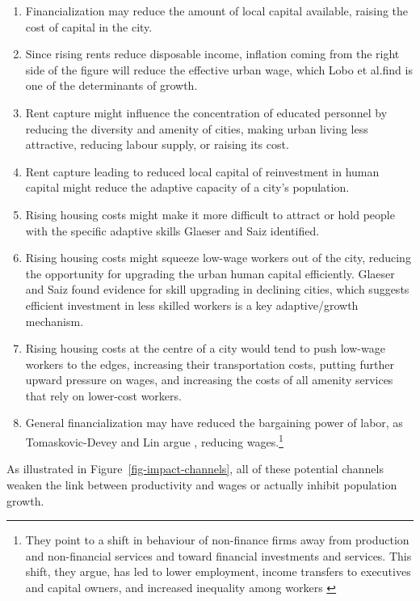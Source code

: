 \begin{enumerate}
\item Financialization may reduce the amount of local capital available, raising the cost of capital in the city. 
    
\item Since rising rents reduce disposable income, inflation coming from the right side of the figure will reduce the effective urban wage, which Lobo et al.find is one of the determinants of growth.

\item Rent capture might influence the concentration of educated personnel by reducing the diversity and amenity of cities, making urban living less attractive, reducing labour supply, or raising its cost.

\item Rent capture leading to reduced local capital of reinvestment in human capital might reduce the adaptive capacity of a city's population.

\item Rising housing costs might make it more difficult to attract or hold people with the specific adaptive skills Glaeser and Saiz identified.

\item  Rising housing costs might squeeze low-wage workers out of the city, reducing the opportunity for upgrading the urban human capital efficiently. Glaeser and Saiz found evidence for skill upgrading in declining cities, which suggests efficient investment in less skilled workers is a key adaptive/growth mechanism. 

\item Rising housing costs at the centre of a city would tend to push low-wage workers to the edges, increasing their transportation costs, putting further upward pressure on wages, and increasing the costs of all amenity services that rely on lower-cost workers.

\item General financialization may have reduced the bargaining power of labor, as Tomaskovic-Devey and Lin argue \cite{tomaskovic-deveyFinancializationCausesInequality2013}, reducing wages.\footnote{They point to a shift in behaviour of non-finance firms away from production and non-financial services and toward financial investments and services. This shift, they argue,  has led to lower employment, income transfers to executives and capital owners, and increased inequality among workers \cite{tomaskovic-deveyFinancializationCausesInequality2013}}
\end{enumerate}
As illustrated in Figure~\ref{fig-impact-channels}, all of these potential channels weaken the link between productivity and wages or actually inhibit population growth.

